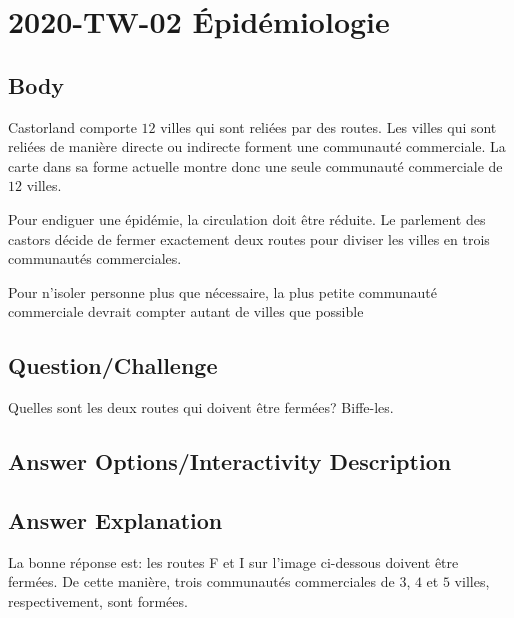 \documentclass[a4paper,11pt]{report}
\newcommand{\taskGraphicsFolder}{..}
\begin{document}
\section*{\centering{} 2020-TW-02 Épidémiologie}


\subsection*{Body}

Castorland comporte $12$ villes qui sont reliées par des routes. Les villes qui sont reliées de manière directe ou indirecte forment une communauté commerciale. La carte dans sa forme actuelle montre donc une seule communauté commerciale de $12$ villes.

Pour endiguer une épidémie, la circulation doit être réduite. Le parlement des castors décide de fermer exactement deux routes pour diviser les villes en trois communautés commerciales.

Pour n’isoler personne plus que nécessaire, la plus petite communauté commerciale devrait compter autant de villes que possible

{\em

\subsection*{Question/Challenge}

Quelles sont les deux routes qui doivent être fermées? Biffe-les.

{\centering%
\par}

}\begingroup
\renewcommand{\arraystretch}{1.5}
\subsection*{Answer Options/Interactivity Description}



\endgroup

\subsection*{Answer Explanation}

La bonne réponse est: les routes F et I sur l’image ci-dessous doivent être fermées. De cette manière, trois communautés commerciales de $3$, $4$ et $5$ villes, respectivement, sont formées.
\end{document}
